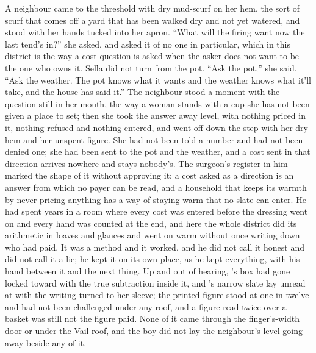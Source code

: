 A neighbour came to the threshold with dry mud-scurf on her hem, the sort of scurf that comes off a yard that has been walked dry and not yet watered, and stood with her hands tucked into her apron. “What will the firing want now the last tend's in?” she asked, and asked it of no one in particular, which in this district is the way a cost-question is asked when the asker does not want to be the one who owns it. Sella did not turn from the pot. “Ask the pot,” she said. “Ask the weather. The pot knows what it wants and the weather knows what it'll take, and the house has said it.” The neighbour stood a moment with the question still in her mouth, the way a woman stands with a cup she has not been given a place to set; then she took the answer away level, with nothing priced in it, nothing refused and nothing entered, and went off down the step with her dry hem and her unspent figure. She had not been told a number and had not been denied one; she had been sent to the pot and the weather, and a cost sent in that direction arrives nowhere and stays nobody's. The surgeon's register in him marked the shape of it without approving it: a cost asked as a direction is an answer from which no payer can be read, and a household that keeps its warmth by never pricing anything has a way of staying warm that no slate can enter. He had spent years in a room where every cost was entered before the dressing went on and every hand was counted at the end, and here the whole district did its arithmetic in loaves and glances and went on warm without once writing down who had paid. It was a method and it worked, and he did not call it honest and did not call it a lie; he kept it on its own place, as he kept everything, with his hand between it and the next thing. Up  and out of hearing, 's box had gone locked toward  with the true subtraction inside it, and 's narrow slate lay unread at  with the writing turned to her sleeve; the printed figure stood at one in twelve and had not been challenged under any roof, and a figure read twice over a basket was still not the figure paid. None of it came through the finger's-width door or under the Vail roof, and the boy did not lay the neighbour's level going-away beside any of it.

